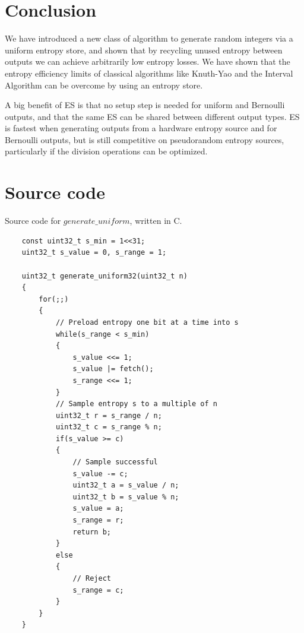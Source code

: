 \documentclass[12pt]{article}
\begin{document}
\section{Conclusion}

We have introduced a new class of algorithm to generate random integers via a uniform entropy store, and shown that by recycling unused entropy between outputs we can achieve arbitrarily low entropy losses. We have shown that the entropy efficiency limits of classical algorithms like Knuth-Yao and the Interval Algorithm can be overcome by using an entropy store. 

A big benefit of ES is that no setup step is needed for uniform and Bernoulli outputs, and that the same ES can be shared between different output types. ES is fastest when generating outputs from a hardware entropy source and for Bernoulli outputs, but is still competitive on pseudorandom entropy sources, particularly if the division operations can be optimized.



\printbibliography

\appendix

\section {Source code} \label{app:source-code}

Source code for $generate\_uniform$, written in C.

\begin{verbatim}
    const uint32_t s_min = 1<<31;
    uint32_t s_value = 0, s_range = 1;

    uint32_t generate_uniform32(uint32_t n)
    {
        for(;;)
        {
            // Preload entropy one bit at a time into s
            while(s_range < s_min)
            {
                s_value <<= 1;
                s_value |= fetch();
                s_range <<= 1;
            }
            // Sample entropy s to a multiple of n
            uint32_t r = s_range / n;
            uint32_t c = s_range % n;
            if(s_value >= c)
            {
                // Sample successful
                s_value -= c;
                uint32_t a = s_value / n;
                uint32_t b = s_value % n;
                s_value = a;
                s_range = r; 
                return b;
            }
            else
            {
                // Reject
                s_range = c;
            }
        }
    }
\end{verbatim}
\end{document}
